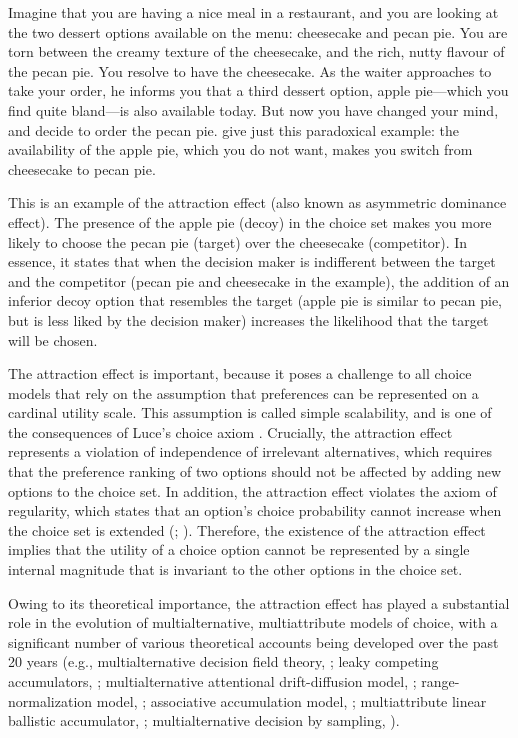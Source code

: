 \documentclass[12pt, a4paper]{article}
\begin{document}
Imagine that you are having a nice meal in a restaurant, and you are looking at the two dessert options available on the menu: cheesecake and pecan pie. You are torn between the creamy texture of the cheesecake, and the rich, nutty flavour of the pecan pie. You resolve to have the cheesecake. As the waiter approaches to take your order, he informs you that a third dessert option, apple pie---which you find quite bland---is also available today. But now you have changed your mind, and decide to order the pecan pie.  give just this paradoxical example: the availability of the apple pie, which you do not want, makes you switch from cheesecake to pecan pie.

This is an example of the attraction effect (also known as asymmetric dominance effect). The presence of the apple pie (decoy) in the choice set makes you more likely to choose the pecan pie (target) over the cheesecake (competitor). In essence, it states that when the decision maker is indifferent between the target and the competitor (pecan pie and cheesecake in the example), the addition of an inferior decoy option that resembles the target (apple pie is similar to pecan pie, but is less liked by the decision maker) increases the likelihood that the target will be chosen.


The attraction effect is important, because it poses a challenge to all choice models that rely on the assumption that preferences can be represented on a cardinal utility scale. This assumption is called simple scalability, and is one of the consequences of Luce's choice axiom \cite{Luce1959}. Crucially, the attraction effect represents a violation of independence of irrelevant alternatives, which requires that the preference ranking of two options should not be affected by adding new options to the choice set. In addition, the attraction effect violates the axiom of regularity, which states that an option's choice probability cannot increase when the choice set is extended (; ). Therefore, the existence of the attraction effect implies that the utility of a choice option cannot be represented by a single internal magnitude that is invariant to the other options in the choice set.

Owing to its theoretical importance, the attraction effect has played a substantial role in the evolution of multialternative, multiattribute models of choice, with a significant number of various theoretical accounts being developed over the past 20 years (e.g., multialternative decision field theory, ; leaky competing accumulators, ; multialternative attentional drift-diffusion model,   ; range-normalization model, ; associative accumulation model, ; multiattribute linear ballistic accumulator, ; multialternative decision by sampling, ).
\end{document}
